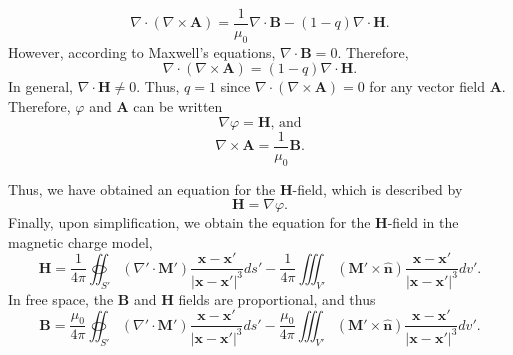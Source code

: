 \begin{equation}
    \nabla \cdot \left( \nabla \times \mathbf{A} \right) = \frac{1}{\mu_0}\nabla \cdot \mathbf{B} - \left(1-q\right)\nabla \cdot \mathbf{H} \text{.}
\end{equation}
However, according to Maxwell's equations, \(\nabla \cdot \mathbf{B} = 0\). Therefore,
\begin{equation}
    \nabla \cdot \left( \nabla \times \mathbf{A} \right) = \left(1-q\right)\nabla \cdot \mathbf{H} \text{.}
\end{equation}
In general, \(\nabla \cdot \mathbf{H} \neq 0\). Thus, \(q = 1\) since \(\nabla \cdot \left( \nabla \times \mathbf{A} \right) = 0\) for any vector field \(\mathbf{A}\). Therefore, \(\varphi\) and \(\mathbf{A}\) can be written
\begin{equation}
    \nabla \varphi = \mathbf{H} \text{, and}
\end{equation}
\begin{equation}
    \nabla \times \mathbf{A} = \frac{1}{\mu_0} \mathbf{B} \text{.}
\end{equation}

Thus, we have obtained an equation for the \(\mathbf{H}\)-field, which is described by
\begin{equation}
    \mathbf{H} = \nabla \varphi \text{.}
\end{equation}
Finally, upon simplification, we obtain the equation for the \(\mathbf{H}\)-field in the magnetic charge model,
\begin{equation}
    \mathbf{H} = \frac{1}{4\pi} \oiint_{S'} \left( \nabla' \cdot \mathbf{M}' \right) \frac{\mathbf{x}-\mathbf{x}'}{\left|\mathbf{x}-\mathbf{x}'\right|^3} ds' - \frac{1}{4\pi} \iiint_{V'} \left( \mathbf{M}' \times \hat{\mathbf{n}} \right) \frac{\mathbf{x}-\mathbf{x}'}{\left|\mathbf{x}-\mathbf{x}'\right|^3} dv' \text{.}
\end{equation}
In free space, the \(\mathbf{B}\) and \(\mathbf{H}\) fields are proportional, and thus
\begin{equation}
    \mathbf{B} = \frac{\mu_0}{4\pi} \oiint_{S'} \left( \nabla' \cdot \mathbf{M}' \right) \frac{\mathbf{x}-\mathbf{x}'}{\left|\mathbf{x}-\mathbf{x}'\right|^3} ds' - \frac{\mu_0}{4\pi} \iiint_{V'} \left( \mathbf{M}' \times \hat{\mathbf{n}} \right) \frac{\mathbf{x}-\mathbf{x}'}{\left|\mathbf{x}-\mathbf{x}'\right|^3} dv' \text{.}
\end{equation}